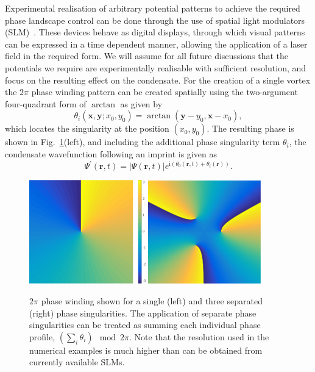 Experimental realisation of arbitrary potential patterns to achieve the required phase landscape control can be done through the use of spatial light modulators (SLM)~\cite{VTX:Moulder_pra_2012}. These devices behave as digital displays, through which visual patterns can be expressed in a time dependent manner, allowing the application of a laser field in the required form. We will assume for all future discussions that the potentials we require are experimentally realisable with sufficient resolution, and focus on the resulting effect on the condensate. For the creation of a single vortex the $2\pi$ phase winding pattern can be created spatially using the two-argument four-quadrant form of $\arctan$ as given by
\begin{equation}
    \theta_i(\mathbf{x},\mathbf{y};x_0,y_0) = \arctan(\mathbf{y}-y_0,\mathbf{x}-x_0),
\end{equation}
which locates the singularity at the position $\left(x_0,y_0\right)$. The resulting phase is shown in Fig.~\ref{fig:atan2phase}(left), and including the additional phase singularity term $\theta_i$, the condensate wavefunction following an imprint is given as
\begin{equation}
    \Psi^{'}(\mathbf{r},t) = |\Psi(\mathbf{r},t)|e^{\text{i}(\theta_0(\mathbf{r},t) + \theta_i(\mathbf{r}))}.
\end{equation}

\begin{figure}\centering
    \includegraphics[width=0.45\textwidth]{Images/ch4_vtx/2pi.pdf}
    \includegraphics[width=0.435\textwidth]{Images/ch4_vtx/3_2pi.pdf}
    \caption{$2\pi$ phase winding shown for a single (left) and three separated (right) phase singularities. The application of separate phase singularities can be treated as summing each individual phase profile, $\left(\displaystyle\sum\limits_i \theta_i \right)\mod 2\pi$. Note that the resolution used in the numerical examples is much higher than can be obtained from currently available SLMs.}\label{fig:atan2phase}
\end{figure}

